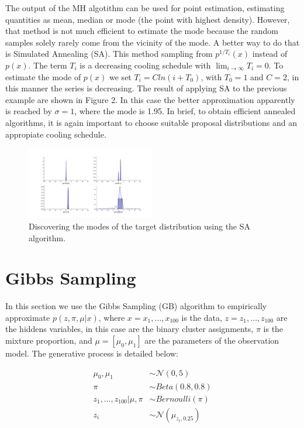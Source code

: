 \documentclass{article}
\begin{document}
The output of the MH algotithm can be used for point estimation, estimating quantities as mean, median or mode (the point with highest density). However, that method is not much efficient to estimate the mode because the random samples solely rarely come from the vicinity of the mode. A better way to do that is Simulated Annealing (SA). This method sampling from $p^{1/T_{i}}(x)$ instead of $p(x)$. The term $T_{i}$ is a decreasing cooling schedule with $\lim_{i\rightarrow \infty} T_{i} = 0$. To estimate the mode of $p(x)$ we set $T_{i} = Cln(i+T_{0})$, with $T_{0}=1$ and $C=2$, in this manner the series is decreasing. The result of applying SA to the previous example are shown in Figure 2. In this case the better approximation apparently is reached by $\sigma=1$, where the mode is 1.95. In brief, to obtain efficient annealed algorithms, it is again important to choose suitable proposal distributions and an appropiate cooling schedule.

\begin{figure}[!h]
    \includegraphics[width=0.5\textwidth]{img/simulated_annealing.pdf} 
    \caption{Discovering the modes of the target distribution using the SA algorithm.}
\end{figure}

\section{Gibbs Sampling}

In this section we use the Gibbs Sampling (GB) algorithm to empirically approximate $p(z,\pi, \mu|x)$, where $x=x_{1}, \ldots, x_{100}$ is the data, $z=z_{1}, \ldots, z_{100}$ are the hiddens variables, in this case are the binary cluster assignments, $\pi$ is the mixture proportion, and $\mu=[\mu_{0}, \mu_{1}]$ are the parameters of the observation model. The generative process is detailed below: 

\begin{align}
\mu_{0}, \mu_{1} &\sim \mathcal{N}(0,5)\\
\pi&\sim Beta(0.8,0.8)\\
z_{1}, \ldots, z_{100}|\mu, \pi &\sim Bernoulli(\pi)\\
z_{i} &\sim \mathcal{N}(\mu_{z_{i}, 0.25}) 
\end{align}
\end{document}
